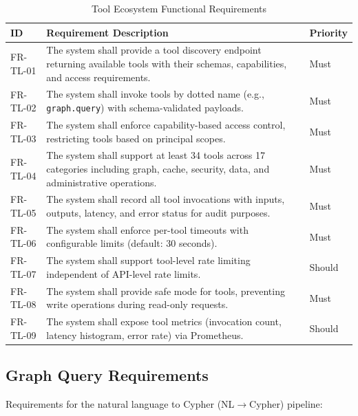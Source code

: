 \documentclass[a4paper,twoside]{sapthesis}
\begin{document}
\begin{table}[htbp]
\centering
\caption{Tool Ecosystem Functional Requirements}
\label{tab:fr-tools}
\small
\begin{tabularx}{\textwidth}{|l|X|l|}
\hline
\textbf{ID} & \textbf{Requirement Description} & \textbf{Priority} \\
\midrule
FR-TL-01 & The system shall provide a tool discovery endpoint returning available tools with their schemas, capabilities, and access requirements. & Must \\
\midrule
FR-TL-02 & The system shall invoke tools by dotted name (e.g., \texttt{graph.query}) with schema-validated payloads. & Must \\
\midrule
FR-TL-03 & The system shall enforce capability-based access control, restricting tools based on principal scopes. & Must \\
\midrule
FR-TL-04 & The system shall support at least 34 tools across 17 categories including graph, cache, security, data, and administrative operations. & Must \\
\midrule
FR-TL-05 & The system shall record all tool invocations with inputs, outputs, latency, and error status for audit purposes. & Must \\
\midrule
FR-TL-06 & The system shall enforce per-tool timeouts with configurable limits (default: 30 seconds). & Must \\
\midrule
FR-TL-07 & The system shall support tool-level rate limiting independent of API-level rate limits. & Should \\
\midrule
FR-TL-08 & The system shall provide safe mode for tools, preventing write operations during read-only requests. & Must \\
\midrule
FR-TL-09 & The system shall expose tool metrics (invocation count, latency histogram, error rate) via Prometheus. & Should \\
\midrule
\end{tabularx}
\end{table}

\subsection{Graph Query Requirements}
\label{subsec:fr-graph}

Requirements for the natural language to Cypher (NL$\rightarrow$Cypher) pipeline:
\end{document}
